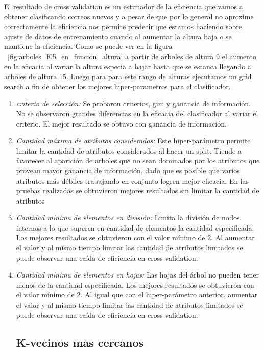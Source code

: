 	El resultado de cross validation es un estimador de la eficiencia que vamos a obtener clasificando correos nuevos y a pesar de que por lo general no aproxime correctamente la eficiencia nos permite predecir que estamos haciendo sobre ajuste de datos de entrenamiento cuando al aumentar la altura baja o se mantiene la eficiencia. Como se puede ver en la figura ~\ref{fig:arboles_f05_en_funcion_altura} a partir de arboles de altura 9 el aumento en la eficacia al variar la altura especia a bajar hasta que se estanca llegando a arboles de altura 15. 
    Luego para para este rango de alturas ejecutamos un grid search a fin de obtener los mejores hiper-parametros para el clasificador. 
 \begin{enumerate}
\item \textit{criterio de selección:} Se probaron criterios, gini y ganancia de información. No se observaron grandes diferencias en la eficacia del clasificador al variar el criterio. El mejor resultado se obtuvo con ganancia de información. 
\item \textit{Cantidad máxima de atributos considerados:} Este hiper-parámetro permite limitar la cantidad de atributos considerados al hacer un split.  Tiende a favorecer al aparición de arboles que no sean dominados por los atributos que provean mayor ganancia de información, dado que es posible que varios atributos más débiles trabajando en conjunto logren mejor eficacia.  En las pruebas realizadas se obtuvieron mejores resultados sin limitar la cantidad de atributos
\item \textit{Cantidad mínima de elementos en división:} Limita la división de nodos internos a lo que superen en cantidad de elementos la cantidad especificada. Los mejores resultados se obtuvieron con el valor mínimo de 2. Al aumentar el valor y al mismo tiempo limitar las cantidad de atributos limitados se puede observar una caída de eficiencia en cross validation. 
\item \textit{Cantidad mínima de elementos en hojas:} Las hojas del árbol no pueden tener menos de la cantidad especificada. Los mejores resultados se obtuvieron con el valor mínimo de 2. Al igual que con el hiper-parámetro anterior, aumentar el valor y al mismo tiempo limitar las cantidad de atributos limitados se puede observar una caída de eficiencia en cross validation.  

\subsection{K-vecinos mas cercanos}


\end{enumerate}
